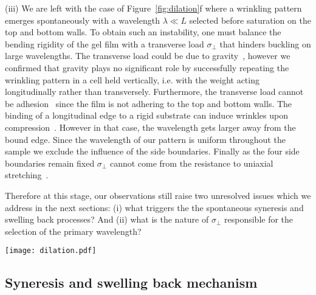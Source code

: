 \documentclass[twocolumn,superscriptaddress,showpacs,preprintnumbers, amsmath,amssymb,prl]{revtex4-1}
\begin{document}
\noindent
(iii) We are left with the case of Figure~\ref{fig:dilation}f where a wrinkling pattern emerges spontaneously with a wavelength $\lambda\ll L$ selected before saturation on the top and bottom walls. To obtain such an instability, one must balance the bending rigidity of the gel film with a transverse load $\sigma_{\perp}$ that hinders buckling on large wavelengths. The transverse load could be due to gravity~\cite{Smoluchowski1910, Kolinski2009, Vella2009, Pineirua2013, Lucantonio2013}, however we confirmed that gravity plays no significant role by successfully repeating the wrinkling pattern in a cell held vertically, i.e. with the weight acting longitudinally rather than transversely. Furthermore, the transverse load cannot be adhesion~\cite{Vella2009a} since the film is not adhering to the top and bottom walls. 
%
The binding of a longitudinal edge to a rigid substrate can induce wrinkles upon compression~\cite{Vandeparre2011a, Li2013}. However in that case, the wavelength gets larger away from the bound edge. Since the wavelength of our pattern is uniform throughout the sample we exclude the influence of the side boundaries.
%
%
Finally as the four side boundaries remain fixed $\sigma_{\perp}$ cannot come from the resistance to uniaxial stretching~\cite{Cerda2003}.

Therefore at this stage, our observations still raise two unresolved issues which we address in the next sections: (i) what triggers the the spontaneous syneresis and swelling back processes? And (ii) what is the nature of $\sigma_{\perp}$ responsible for the selection of the primary wavelength?

\begin{figure*}
\texttt{[image: dilation.pdf]}
\caption{The wrinkling experiment. (a) Initial configuration where the sealed cell contains a homogeneous protein solution. (b) Around the isoelectric pH, the gel forms and immediately expels solvent leading to (c). If tensile stresses were not released we would observe reversible swelling back leading to (d) a flat swollen gel layer. If tensile stresses are released, swelling back leads either to buckling (e) or to wrinkling (f) depending on whether the bending is free or hindered by a transverse load.}
\label{fig:dilation}
\end{figure*}

\subsection*{Syneresis and swelling back mechanism}
\end{document}
